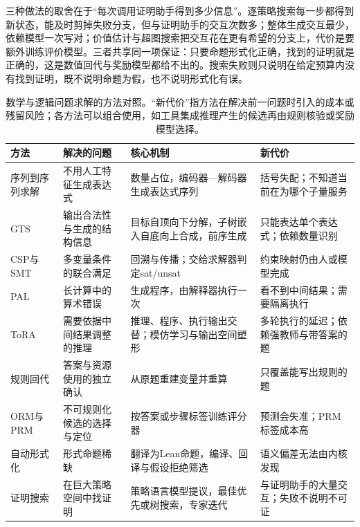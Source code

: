 三种做法的取舍在于“每次调用证明助手得到多少信息”。逐策略搜索每一步都得到新状态，能及时剪掉失败分支，但与证明助手的交互次数多；整体生成交互最少，依赖模型一次写对；价值估计与超图搜索把交互花在更有希望的分支上，代价是要额外训练评价模型。三者共享同一项保证：只要命题形式化正确，找到的证明就是正确的，这是数值回代与奖励模型都给不出的。搜索失败则只说明在给定预算内没有找到证明，既不说明命题为假，也不说明形式化有误。

\begin{table}[t]
  \centering
  \small
  \caption{数学与逻辑问题求解的方法对照。“新代价”指方法在解决前一问题时引入的成本或残留风险；各方法可以组合使用，如工具集成推理产生的候选再由规则核验或奖励模型选择。}
  \label{tab:nlp-execution-solving-methods}
  \begin{tabularx}{\linewidth}{@{}p{30mm}p{34mm}Xp{40mm}@{}}
    \toprule
    方法 & 解决的问题 & 核心机制 & 新代价\\
    \midrule
    序列到序列求解 & 不用人工特征生成表达式 & 数量占位，编码器—解码器生成表达式序列 & 括号失配；不知道当前在为哪个子量服务\\
    GTS & 输出合法性与生成的结构信息 & 目标自顶向下分解，子树嵌入自底向上合成，前序生成 & 只能表达单个表达式；依赖数量识别\\
    CSP与SMT & 多变量条件的联合满足 & 回溯与传播；交给求解器判定sat/unsat & 约束映射仍由人或模型完成\\
    PAL & 长计算中的算术错误 & 生成程序，由解释器执行一次 & 看不到中间结果；需要隔离执行\\
    ToRA & 需要依据中间结果调整的推理 & 推理、程序、执行输出交替；模仿学习与输出空间塑形 & 多轮执行的延迟；依赖强教师与带答案的题\\
    规则回代 & 答案与资源使用的独立确认 & 从原题重建变量并重算 & 只覆盖能写出规则的题\\
    ORM与PRM & 不可规则化候选的选择与定位 & 按答案或步骤标签训练评分器 & 预测会失准；PRM标签成本高\\
    自动形式化 & 形式命题稀缺 & 翻译为Lean命题，编译、回译与假设拒绝筛选 & 语义偏差无法由内核发现\\
    证明搜索 & 在巨大策略空间中找证明 & 策略语言模型提议，最佳优先或树搜索，专家迭代 & 与证明助手的大量交互；失败不说明不可证\\
    \bottomrule
  \end{tabularx}
\end{table}
